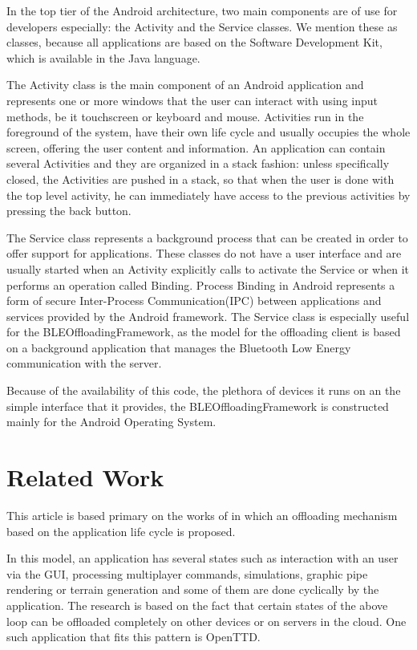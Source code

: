 In the top tier of the Android architecture, two main components are of use for developers especially: the Activity and the Service classes. We mention these as classes, because all applications are based on the Software Development Kit, which is available in the Java language.

The Activity class is the main component of an Android application and represents one or more windows that the user can interact with using input methods, be it touchscreen or keyboard and mouse. Activities run in the foreground of the system, have their own life cycle  and usually occupies the whole screen, offering the user content and information. An application can contain several Activities and they are organized in a stack fashion: unless specifically closed, the Activities are pushed in a stack, so that when the user is done with the top level activity, he can immediately have access to the previous activities by pressing the back button.

The Service class represents a background process that can be created in order to offer support for applications. These classes do not have a user interface and are usually started when an Activity explicitly calls to activate the Service or when it performs an operation called Binding. Process Binding in Android represents a form of secure Inter-Process Communication(IPC)  between applications and services provided by the Android framework. The Service class is especially useful for the BLEOffloadingFramework, as the model for the offloading client is based on a background application that manages the Bluetooth Low Energy communication with the server.

Because of the availability of this code, the plethora of devices it runs on an the simple interface that it provides, the BLEOffloadingFramework is constructed mainly for the Android Operating System.


\section{Related Work}
\label{relatedwork}

This article is based primary on the works of \cite{olteanu2013extending} in which an offloading mechanism based on the application life cycle is proposed.

In this model, an application has several states such as interaction with an user via the GUI, processing multiplayer commands, simulations, graphic pipe rendering or terrain generation and some of them are done cyclically by the application. The research is based on the fact that certain states of the above loop can be offloaded completely on other devices or on servers in the cloud. One such application that fits this pattern is OpenTTD. 


